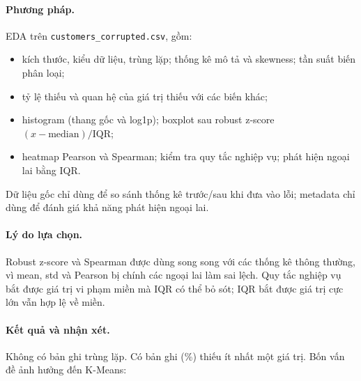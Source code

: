 \documentclass[11pt,a4paper]{article}
\begin{document}
\paragraph{Phương pháp.}
EDA trên \texttt{customers\_corrupted.csv}, gồm:
\begin{itemize}
  \item kích thước, kiểu dữ liệu, trùng lặp; thống kê mô tả và skewness; tần suất biến phân loại;
  \item tỷ lệ thiếu và quan hệ của giá trị thiếu với các biến khác;
  \item histogram (thang gốc và log1p); boxplot sau robust z-score $(x - \text{median})/\text{IQR}$;
  \item heatmap Pearson và Spearman; kiểm tra quy tắc nghiệp vụ; phát hiện ngoại lai bằng IQR.
\end{itemize}
Dữ liệu gốc chỉ dùng để so sánh thống kê trước/sau khi đưa vào lỗi; metadata chỉ dùng để đánh giá khả năng phát hiện ngoại lai.

\paragraph{Lý do lựa chọn.}
Robust z-score và Spearman được dùng song song với các thống kê thông thường, vì mean, std và Pearson bị chính các ngoại lai làm sai lệch. Quy tắc nghiệp vụ bắt được giá trị vi phạm miền mà IQR có thể bỏ sót; IQR bắt được giá trị cực lớn vẫn hợp lệ về miền.

\paragraph{Kết quả và nhận xét.}
Không có bản ghi trùng lặp. Có \MissingRecords{} bản ghi (\MissingRecordsPct\%) thiếu ít nhất một giá trị. Bốn vấn đề ảnh hưởng đến K-Means:
\end{document}
